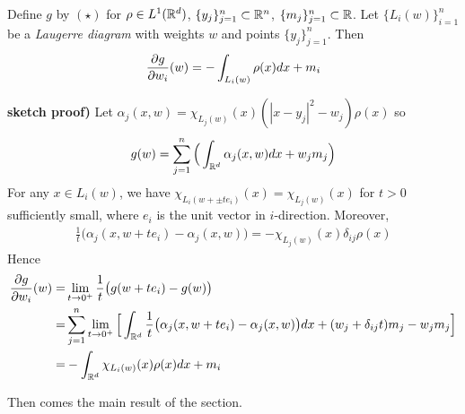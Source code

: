 \documentclass[12pt,a4paper]{article}
\newenvironment{proof}
{\begin{changemargin}{1cm}{0.5cm} 
	}%
	{\end{changemargin}
}
\newenvironment{p}
{\begin{proof} 
	}%
	{\end{proof}
}
\begin{document}
 Define $g$ by $(\star)$ for $\rho \in L^1(\mathbb{R}^d)$, $\{y_j \}_{j=1}^n \subset \mathbb{R}^n$, $\{m_j \}_{j=1}^n \subset \mathbb{R}$. Let $\{L_i(w)\}_{i=1}^n$ be a \emph{Laugerre diagram} with weights $w$ and points $\{y_j \}_{j=1}^n$. Then
\begin{align*}
\frac{\partial g}{\partial w_i}(w) = -\int_{L_i(w)} \rho(x) dx + m_i
\end{align*}
\begin{p}
\textbf{sketch proof)} Let $\alpha_j(x, w) = \chi_{L_j(w)}(x) (|x-y_j|^2 -w_j) \rho(x)$ so 
\begin{align*}
g(w) = \sum_{j=1}^n \Big( \int_{\mathbb{R}^d} \alpha_j(x, w) dx + w_j m_j \Big)
\end{align*} 
For any $x\in L_i(w)$, we have $\chi_{L_i(w + \pm t e_i)} (x) = \chi_{L_j(w)}(x)$ for $t>0$ sufficiently small, where $e_i$ is the unit vector in $i$-direction. Moreover,
\begin{align*}
\frac{1}{t} \big( \alpha_j (x, w+ t e_i) - \alpha_j (x, w) \big) = - \chi_{L_j(w)}(x) \delta_{ij} \rho(x)
\end{align*}
Hence
\begin{align*}
\frac{\partial g}{\partial w_i}(w) = & \lim_{t\rightarrow 0^+} \frac{1}{t} \big( g(w+ t e_i) - g(w) \big) \\
=& \sum_{j=1}^n \lim_{t\rightarrow 0^+} \Big[ \int_{\mathbb{R}^d} \frac{1}{t} \big( \alpha_j(x, w+ te_i) - \alpha_j(x, w) \big) dx + (w_j + \delta_{ij} t)m_j - w_j m_j \Big] \\
=& -\int_{\mathbb{R}^d} \chi_{L_i(w)}(x) \rho(x) dx + m_i
\end{align*}
\eop
\end{p}
\s

Then comes the main result of the section.
\s
\end{document}

